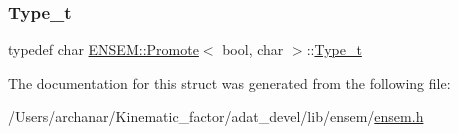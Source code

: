 \subsubsection{\texorpdfstring{Type\_t}{Type\_t}\hspace{0.1cm}{\footnotesize\ttfamily [2/2]}}
{\footnotesize\ttfamily typedef char \mbox{\hyperlink{structENSEM_1_1Promote}{E\+N\+S\+E\+M\+::\+Promote}}$<$ bool, char $>$\+::\mbox{\hyperlink{structENSEM_1_1Promote_3_01bool_00_01char_01_4_a77d88dbc5eb685f290b3b9bb1b2b2a67}{Type\+\_\+t}}}



The documentation for this struct was generated from the following file\+:\begin{DoxyCompactItemize}
\item 
/\+Users/archanar/\+Kinematic\+\_\+factor/adat\+\_\+devel/lib/ensem/\mbox{\hyperlink{lib_2ensem_2ensem_8h}{ensem.\+h}}\end{DoxyCompactItemize}
